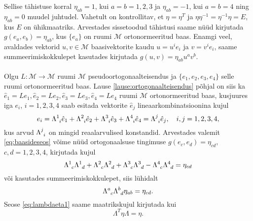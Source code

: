 \documentclass[12pt,a4paper,oneside]{article}
\theoremstyle{plain}
\theoremstyle{definition}
\numberwithin{equation}{section}
\def\M{{\mathcal M}}
\begin{document}
Sellise tähistuse korral $\eta_{ab} = 1$, kui $a = b = 1, 2, 3$ ja 
$\eta_{ab} = -1$, kui $a = b = 4$ ning $\eta_{ab} = 0$ muudel 
juhtudel. Vahetult on kontrollitav, et $\eta = \eta^T$ ja 
$\eta \eta^{-1} = \eta^{-1} \eta = E$, kus $E$ on ühikmaatriks.
\newline
Arvestades sissetoodud tähistusi saame nüüd kirjutada 
$g\left(e_a, e_b\right) = \eta_{ab}$, kus $\{e_a\}$ on ruumi $\M$ 
ortonormeeritud baas. Enamgi veel, avaldades vektorid $u, v \in \M$ 
baasivektorite kaudu $u = u^i e_i$ ja $v = v^i e_i$, saame 
summeerimiskokkulepet kasutades kirjutada $g \left(u, v\right) = 
\eta_{ab} u^a v^b$.

\paragraph{} Olgu $L : \M \rightarrow \M$ ruumi $\M$ 
pseudoortogonaalteisendus ja $\{e_1, e_2, e_3, e_4\}$ selle ruumi 
ortonormeeritud baas. Lause \ref{lause:ortogonaalteisendus} põhjal 
on siis ka $\hat{e}_1 = Le_1, \hat{e}_2  = Le_2, \hat{e}_3 = Le_3, 
\hat{e}_4 = Le_4$ ruumi $\M$ ortonormeeritud baas, kusjuures iga 
$e_i$, $i = 1,2,3,4$ saab esitada vektorite $\hat{e}_j$ 
lineaarkombinatsioonina kujul
\begin{equation} \label{eq:baasideseos}
e_i = \Lambda\indices{^1_i} \hat{e}_1 + \Lambda\indices{^2_i} 
\hat{e}_2 + \Lambda\indices{^3_i} \hat{e}_3 + \Lambda\indices{^4_i} 
\hat{e}_4 = \Lambda\indices{^j_i} \hat{e}_j, \quad i,j = 1, 2, 3, 4,
\end{equation}
kus arvud $\Lambda\indices{^j_i}$ on mingid reaalarvulised konstandid. 
Arvestades valemit \ref{eq:baasideseos} võime nüüd ortogonaalsuse 
tingimuse $g \left(e_c, e_d\right) = \eta_{cd}$, $c, d = 1, 2, 3, 4$, 
kirjutada kujul
\begin{equation*}
\Lambda\indices{^1_c} \Lambda\indices{^1_d} + \Lambda\indices{^2_c} 
\Lambda\indices{^2_d} + \Lambda\indices{^3_c} \Lambda\indices{^3_d} - 
\Lambda\indices{^4_c} \Lambda\indices{^4_d} = \eta_{cd}
\end{equation*}
või kasutades summeerimiskokkulepet, siis lühidalt
\begin{equation} \label{eq:lambdaeta1}
\Lambda\indices{^a_c} \Lambda\indices{^b_d} \eta_{ab} = \eta_{cd}.
\end{equation}
Seose \ref{eq:lambdaeta1} saame maatrikskujul kirjutada kui
\begin{equation} \label{eq:lambdaetamat1}
\Lambda^T \eta \Lambda = \eta.
\end{equation}
\end{document}
